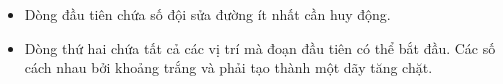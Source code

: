 \begin{itemize}
	\item     Dòng đầu tiên chứa số đội sửa đường ít nhất cần huy động.   
	\item     Dòng thứ hai chứa tất cả các vị trí mà đoạn đầu tiên có thể bắt đầu. Các số cách nhau bởi khoảng trắng và phải tạo thành một dãy tăng chặt.   
\end{itemize}